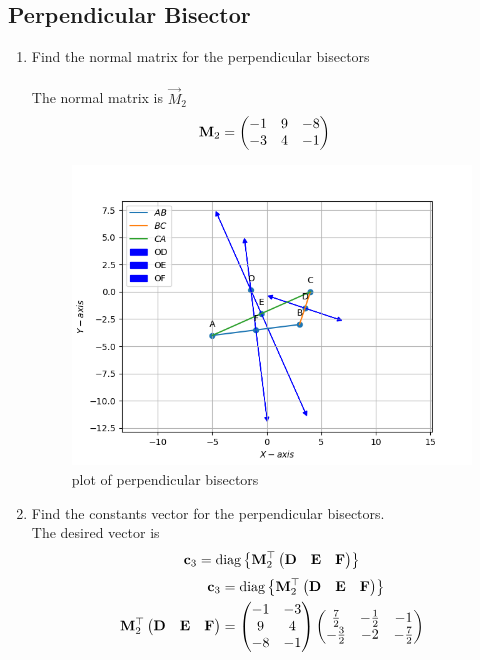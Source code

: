 \documentclass[10pt]{book}
\begin{document}
\subsection{Perpendicular Bisector}
\begin{enumerate}[label=\thesubsection.\arabic*.,ref=\thesubsection.\theenumi]
\item Find the normal matrix for the perpendicular bisectors \\
\solution\\
The normal matrix is $\vec{M}_2$
\begin{align}
       \mathbf{M}_2 &=\begin{pmatrix}-1 & 9 & -8 \\ -3 & 4 & -1\end{pmatrix}
\end{align}
\begin{figure}[H]
    \centering
    \includegraphics{figs/perpendicular_bisectors.png}
    \caption{plot of perpendicular bisectors}
    \label{fig:perpendicular_bisectors}
\end{figure}
\item Find the constants vector for the perpendicular bisectors. \\
\solution The desired vector is 
\begin{align}
\mathbf{c}_3 = \text{diag}\left\{\mathbf{M}_2^{\top}\begin{pmatrix}\mathbf{D} & \mathbf{E} &\mathbf{F}\end{pmatrix}\right\}
\end{align}
\solution
\begin{align}
\vec{c}_3 &= \text{diag}\cbrak{\vec{M}_2^{\top}\myvec{\vec{D} & \vec{E} &\vec{F}}} \\
\vec{M}_2^{\top}\myvec{\vec{D} & \vec{E} &\vec{F}} &= \myvec{-1&-3 \\ 9&4 \\ -8 &-1}\myvec{\frac{7}{2} & -\frac{1}{2} & -1 \\ -\frac{3}{2} & -2 & -\frac{7}{2}} \\

\end{align}
\end{enumerate}
\end{document}
